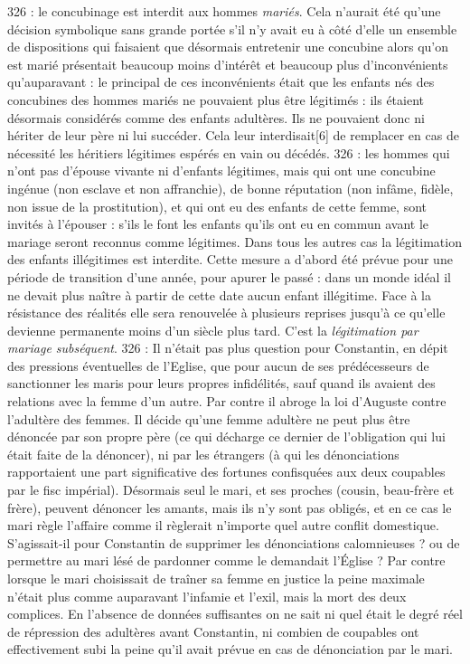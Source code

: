  326 : le concubinage est interdit aux hommes \emph{mariés}. Cela n'aurait été qu'une décision symbolique sans grande portée s'il n'y avait eu à côté d'elle un ensemble de dispositions qui faisaient que désormais entretenir une concubine alors qu'on est marié présentait beaucoup moins d'intérêt et beaucoup plus d'inconvénients qu'auparavant : le principal de ces inconvénients était que les enfants nés des concubines des hommes mariés ne pouvaient plus être légitimés : ils étaient désormais considérés comme des enfants adultères. Ils ne pouvaient donc ni hériter de leur père ni lui succéder. Cela leur interdisait[6] de remplacer en cas de nécessité les héritiers légitimes espérés en vain ou décédés. 
 326 : les hommes qui n'ont pas d'épouse vivante ni d'enfants légitimes, mais qui ont une concubine ingénue (non esclave et non affranchie), de bonne réputation (non infâme, fidèle, non issue de la prostitution), et qui ont eu des enfants de cette femme, sont invités à l'épouser : s'ils le font les enfants qu'ils ont eu en commun avant le mariage seront reconnus comme légitimes. Dans tous les autres cas la légitimation des enfants illégitimes est interdite. Cette mesure a d'abord été prévue pour une période de transition d'une année, pour apurer le passé : dans un monde idéal il ne devait plus naître à partir de cette date aucun enfant illégitime. Face à la résistance des réalités elle sera renouvelée à plusieurs reprises jusqu'à ce qu'elle devienne permanente moins d'un siècle plus tard. C'est la \emph{légitimation par mariage subséquent}.
 326 : Il n'était pas plus question pour Constantin, en dépit des pressions éventuelles de l'Eglise, que pour aucun de ses prédécesseurs de sanctionner les maris pour leurs propres infidélités, sauf quand ils avaient des relations avec la femme d'un autre. Par contre il abroge la loi d'Auguste contre l'adultère des femmes. Il décide qu'une femme adultère ne peut plus être dénoncée par son propre père (ce qui décharge ce dernier de l'obligation qui lui était faite de la dénoncer), ni par les étrangers (à qui les dénonciations rapportaient une part significative des fortunes confisquées aux deux coupables par le fisc impérial). Désormais seul le mari, et ses proches (cousin, beau-frère et frère), peuvent dénoncer les amants, mais ils n'y sont pas obligés, et en ce cas le mari règle l'affaire comme il règlerait n'importe quel autre conflit domestique. S'agissait-il pour Constantin de supprimer les dénonciations calomnieuses ? ou de permettre au mari lésé de pardonner comme le demandait l'Église ? Par contre lorsque le mari choisissait de traîner sa femme en justice la peine maximale n'était plus comme auparavant l'infamie et l'exil, mais la mort des deux complices. En l'absence de données suffisantes on ne sait ni quel était le degré réel de répression des adultères avant Constantin, ni combien de coupables ont effectivement subi la peine qu'il avait prévue en cas de dénonciation par le mari. 
